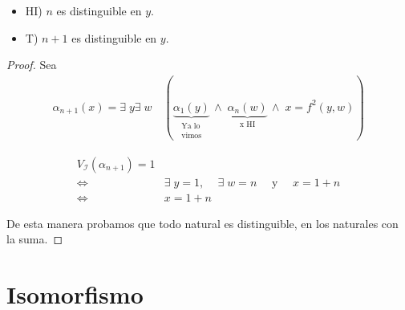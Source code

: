 \begin{itemize}
        \begin{itemize}
            \item HI) $n$ es distinguible en $y$.
            \item T) $n+1$ es distinguible en $y$.
        \end{itemize}

        \begin{proof} \phantom{.}

            Sea
            \begin{gather*}
                \alpha_{n+1}(x) = \exists\; y \exists \; w
                \quad (
                \underbrace{\alpha_1(y)}_{\substack{\text{Ya lo}\\
                    \text{vimos}}} \,
                \wedge \;
                \underbrace{\alpha_n(w)}_{\text{x HI}} \,
                \wedge \;
                x = f^2(y,w))
            \end{gather*}

            \begin{align*}
                V_{\mathcal{I}}(\alpha_{n+1}) = 1 \\
                \iff & \exists\; y = 1 \text{, } 
                \quad \exists \; w = n 
                \quad \text{ y } 
                \quad x = 1 + n \\
                \iff & x = 1 + n
            \end{align*}

            De esta manera probamos que todo natural es distinguible,
            en los naturales con la suma.

        \end{proof}
\end{itemize}

\section{Isomorfismo}

